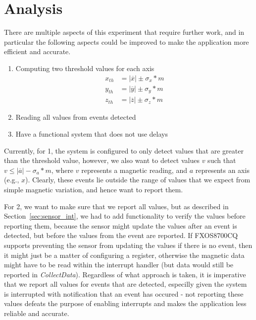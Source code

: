\section{Analysis}
\label{sec:analysis}

There are multiple aspects of this experiment that require further work, and in
particular the following aspects could be improved to make the application more
efficient and accurate.

\begin{enumerate}
\item Computing two threshold values for each axis
\begin{align}
    x_{th} &= \lvert \overline{x} \rvert \pm \sigma_{x} * m \\
    y_{th} &= \lvert \overline{y} \rvert \pm \sigma_{y} * m \\
    z_{th} &= \lvert \overline{z} \rvert \pm \sigma_{z} * m
\end{align}
\item Reading all values from events detected
\item Have a functional system that does not use delays
\end{enumerate}

Currently, for 1, the system is configured to only detect values that are
greater than the threshold value, however, we also want to detect values $v$
such that $v \le \lvert \overline{a} \rvert - \sigma_{a} * m$, where $v$
represents a magnetic reading, and $a$ represents an axis (e.g., $x$). Clearly,
these events lie outside the range of values that we expect from simple magnetic
variation, and hence want to report them.

For 2, we want to make sure that we report all values, but as described in
Section~\ref{sec:sensor_int}, we had to add functionality to verify the values
before reporting them, because the sensor might update the values after an event
is detected, but before the values from the event are reported. If FXOS8700CQ
supports preventing the sensor from updating the values if there is no event,
then it might just be a matter of configuring a register, otherwise the magnetic
data might have to be read within the interrupt handler (but data would still be
reported in \textit{CollectData}). Regardless of what approach is taken, it is
imperative that we report all values for events that are detected, especilly
given the system is interrupted with notification that an event has occured -
not reporting these values defeats the purpose of enabling interrupts and makes
the application less reliable and accurate.

